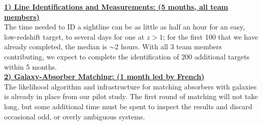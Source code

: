 \documentclass[12pt]{article}
\begin{document}



%
%
\budgetnarrative       %

\noindent \textbf{\underline{1) Line Identifications and Measurements: (5 months, all team members)}}\\
\indent The time needed to ID a sightline can be as little as half an hour for an easy, low-redshift target, to several days for one at $z>1$; for the first 100 that we have already completed, the median is $\sim 2$ hours. With all 3 team members contributing, we expect to complete the identification of 200 additional targets within 5 months.\\

\noindent \textbf{\underline{2) Galaxy-Absorber Matching: (1 month led by French)}}\\
\indent The likelihood algorithm and infrastructure for matching absorbers with galaxies is already in place from our pilot study. The first round of matching will not take long, but some additional time must be spent to inspect the results and discard occasional odd, or overly ambiguous systems. \\
\end{document}
